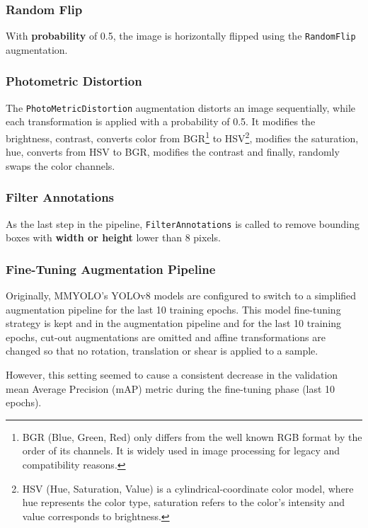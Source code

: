 \subsubsection*{Random Flip}

With \textbf{probability} of 0.5, the image is horizontally flipped using the
\texttt{RandomFlip} augmentation.

\subsubsection*{Photometric Distortion}

The \texttt{PhotoMetricDistortion} augmentation distorts an image sequentially,
while each transformation is applied with a probability of 0.5. It modifies the
brightness, contrast, converts color from BGR\footnote{BGR (Blue, Green, Red)
only differs from the well known RGB format by the order of its channels. It is
widely used in image processing for legacy and compatibility reasons.} to
HSV\footnote{HSV (Hue, Saturation, Value) is a cylindrical-coordinate color
model, where hue represents the color type, saturation refers to the color's
intensity and value corresponds to brightness.}, modifies the saturation,
hue, converts from HSV to BGR, modifies the contrast and finally, randomly swaps
the color channels.

\subsubsection*{Filter Annotations}

As the last step in the pipeline, \texttt{FilterAnnotations} is called to remove
bounding boxes with \textbf{width or height} lower than \num{8} pixels.

\subsubsection{Fine-Tuning Augmentation Pipeline}

Originally, MMYOLO's YOLOv8 models are configured to switch to a simplified
augmentation pipeline for the last 10 training epochs. This model fine-tuning
strategy is kept and in the augmentation pipeline and for the last 10 training
epochs, cut-out augmentations are omitted and affine transformations are changed
so that no rotation, translation or shear is applied to a sample.

However, this setting seemed to cause a consistent decrease in the validation
mean Average Precision (mAP) metric during the fine-tuning phase (last 10
epochs).



